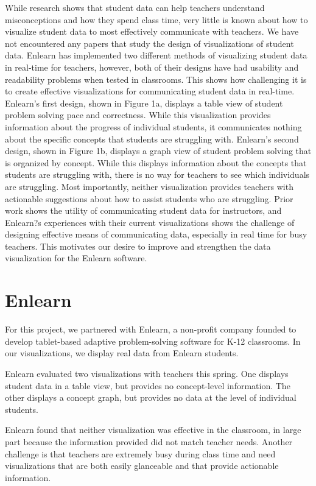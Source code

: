 \documentclass{sigchi}
\begin{document}
While research shows that student data can help teachers understand misconceptions and how they spend class time, very little is known about how to visualize student data to most effectively communicate with teachers. We have not encountered any papers that study the design of visualizations of student data. Enlearn has implemented two different methods of visualizing student data in real-time for teachers, however, both of their designs have had usability and readability problems when tested in classrooms. This shows how challenging it is to create effective visualizations for communicating student data in real-time. Enlearn's first design, shown in Figure 1a, displays a table view of student problem solving pace and correctness. While this visualization provides information about the progress of individual students, it communicates nothing about the specific concepts that students are struggling with. Enlearn's second design, shown in Figure 1b, displays a graph view of student problem solving that is organized by concept. While this displays information about the concepts that students are struggling with, there is no way for teachers to see which individuals are struggling. Most importantly, neither visualization provides teachers with actionable suggestions about how to assist students who are struggling. Prior work shows the utility of communicating student data for instructors, and Enlearn?s experiences with their current visualizations shows the challenge of designing effective means of communicating data, especially in real time for busy teachers. This motivates our desire to improve and strengthen the data visualization for the Enlearn software.

\section{Enlearn}
For this project, we partnered with Enlearn, a non-profit company founded to develop tablet-based adaptive problem-solving software for K-12 classrooms. In our visualizations, we display real data from Enlearn students.

Enlearn evaluated two visualizations with teachers this spring. One displays student data in a table view, but provides no concept-level information. The other displays a concept graph, but provides no data at the level of individual students.

Enlearn found that neither visualization was effective in the classroom, in large part because the information provided did not match teacher needs. Another challenge is that teachers are extremely busy during class time and need visualizations that are both easily glanceable and that provide actionable information.
\end{document}
